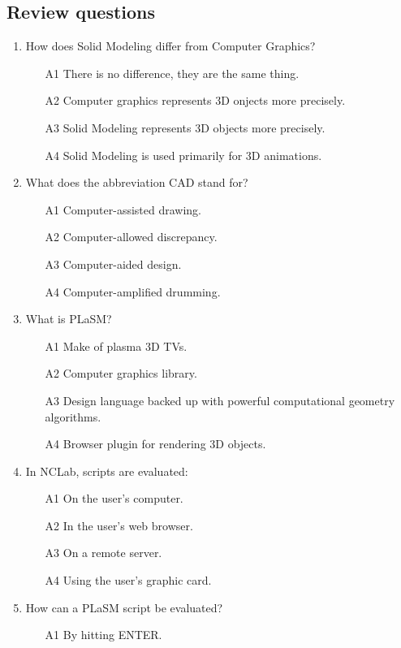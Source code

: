 \documentclass{article}
\begin{document}
\subsection{Review questions}

\begin{enumerate}
\item How does Solid Modeling differ from Computer Graphics?
\begin{itemize}
\item[A1] There is no difference, they are the same thing. 
\item[A2] Computer graphics represents 3D onjects more precisely.
\item[A3] Solid Modeling represents 3D objects more precisely.
\item[A4] Solid Modeling is used primarily for 3D animations.
\end{itemize}
\item What does the abbreviation CAD stand for?
\begin{itemize}
\item[A1] Computer-assisted drawing.
\item[A2] Computer-allowed discrepancy.
\item[A3] Computer-aided design.
\item[A4] Computer-amplified drumming.
\end{itemize}
\item What is PLaSM?
\begin{itemize}
\item[A1] Make of plasma 3D TVs.
\item[A2] Computer graphics library.
\item[A3] Design language backed up with powerful computational geometry algorithms.
\item[A4] Browser plugin for rendering 3D objects.
\end{itemize}
\item In NCLab, scripts are evaluated:
\begin{itemize}
\item[A1] On the user's computer.
\item[A2] In the user's web browser.
\item[A3] On a remote server.
\item[A4] Using the user's graphic card.
\end{itemize}
\item How can a PLaSM script be evaluated?
\begin{itemize}
\item[A1] By hitting ENTER.

\end{itemize}
\end{enumerate}
\end{document}
